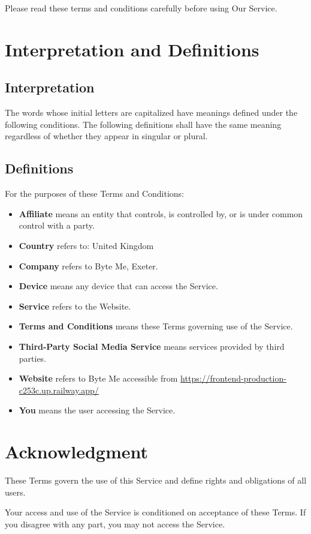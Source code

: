 \documentclass[11pt, a4paper]{report}
\begin{document}
Please read these terms and conditions carefully before using Our Service.

\section*{Interpretation and Definitions}

\subsection*{Interpretation}
The words whose initial letters are capitalized have meanings defined under the following conditions. The following definitions shall have the same meaning regardless of whether they appear in singular or plural.

\subsection*{Definitions}
For the purposes of these Terms and Conditions:

\begin{itemize}
	\item \textbf{Affiliate} means an entity that controls, is controlled by, or is under common control with a party.
	\item \textbf{Country} refers to: United Kingdom
	\item \textbf{Company} refers to Byte Me, Exeter.
	\item \textbf{Device} means any device that can access the Service.
	\item \textbf{Service} refers to the Website.
	\item \textbf{Terms and Conditions} means these Terms governing use of the Service.
	\item \textbf{Third-Party Social Media Service} means services provided by third parties.
	\item \textbf{Website} refers to Byte Me accessible from \url{https://frontend-production-c253c.up.railway.app/}
	\item \textbf{You} means the user accessing the Service.
\end{itemize}

\section*{Acknowledgment}
These Terms govern the use of this Service and define rights and obligations of all users.

Your access and use of the Service is conditioned on acceptance of these Terms. If you disagree with any part, you may not access the Service.
\end{document}
